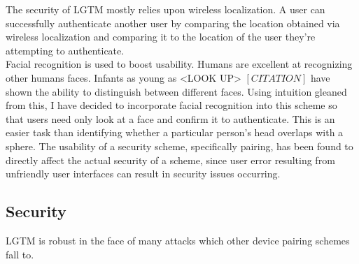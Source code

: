 \documentclass[12pt]{report}
\begin{document}
The security of LGTM mostly relies upon wireless localization. A user can successfully authenticate another user by comparing the location obtained via wireless localization and comparing it to the location of the user they're attempting to authenticate. \\

Facial recognition is used to boost usability. Humans are excellent at recognizing other humans faces. Infants as young as <LOOK UP> $[CITATION]$ have shown the ability to distinguish between different faces. Using intuition gleaned from this, I have decided to incorporate facial recognition into this scheme so that users need only look at a face and confirm it to authenticate. This is an easier task than identifying whether a particular person's head overlaps with a sphere. The usability of a security scheme, specifically pairing, has been found to directly affect the actual security of a scheme, since user error resulting from unfriendly user interfaces can result in security issues occurring.


\subsection{Security}
LGTM is robust in the face of many attacks which other device pairing schemes fall to. 
\end{document}
